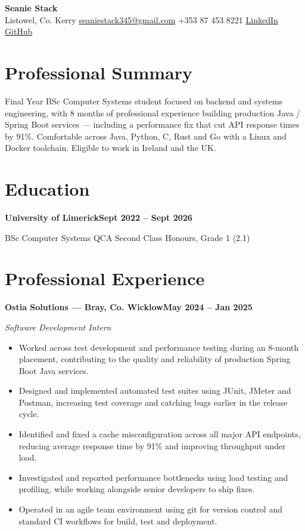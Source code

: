 \documentclass[10pt]{article}
\newcommand{\entry}[2]{\textbf{#1}\hfill\textbf{#2}\par}
\begin{document}
\begin{center}
  {\huge\bfseries\color{accent}Seanie Stack}\\[3pt]
  \small
  Listowel, Co. Kerry \;\textbullet\;
  \href{mailto:seaniestack345@gmail.com}{seaniestack345@gmail.com} \;\textbullet\;
  +353 87 453 8221 \;\textbullet\;
  \href{https://linkedin.com/in/seanie-stack}{LinkedIn} \;\textbullet\;
  \href{https://github.com/seanieStack}{GitHub}
\end{center}

\section{Professional Summary}
Final Year BSc Computer Systems student focused on backend and systems engineering, with 8 months of professional experience building production Java / Spring Boot services --- including a performance fix that cut API response times by 91\%. Comfortable across Java, Python, C, Rust and Go with a Linux and Docker toolchain. Eligible to work in Ireland and the UK.

\section{Education}

\entry{University of Limerick}{Sept 2022 -- Sept 2026}
BSc Computer Systems \;\textbullet{} QCA \;\textbullet\; Second Class Honours, Grade 1 (2.1)

\section{Professional Experience}
\entry{Ostia Solutions \normalfont\textcolor{muted}{--- Bray, Co. Wicklow}}{May 2024 -- Jan 2025}
\textit{Software Development Intern}
\begin{itemize}
  \item Worked across test development and performance testing during an 8-month placement, contributing to the quality and reliability of production Spring Boot Java services.
  \item Designed and implemented automated test suites using JUnit, JMeter and Postman, increasing test coverage and catching bugs earlier in the release cycle.
  \item Identified and fixed a cache misconfiguration across all major API endpoints, reducing average response time by 91\% and improving throughput under load.
  \item Investigated and reported performance bottlenecks using load testing and profiling, while working alongside senior developers to ship fixes.
  \item Operated in an agile team environment using git for version control and standard CI workflows for build, test and deployment.
\end{itemize}
\end{document}

